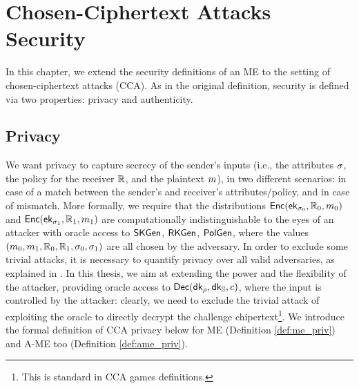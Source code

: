 \chapter{Chosen-Ciphertext Attacks Security}
In this chapter, we extend the security definitions of an ME to the setting of chosen-ciphertext attacks (CCA).
As in the original definition, security is defined via two properties: privacy and authenticity.

\section{Privacy}\label{sec:cca-privacy}
We want privacy to capture secrecy of the sender's inputs (i.e., the attributes $\sigma$, the policy for the receiver $\mathbb{R}$, and the plaintext $m$), in two different scenarios: in case of a match between the sender's and receiver's attributes/policy, and in case of mismatch.
More formally, we require that the distributions $\mathsf{Enc}(\mathsf{ek}_{\sigma_0}, \mathbb{R}_0, m_0)$ and $\mathsf{Enc}(\mathsf{ek}_{\sigma_1}, \mathbb{R}_1, m_1)$ are computationally indistinguishable to the eyes of an attacker with oracle access to $\mathsf{SKGen}$, $\mathsf{RKGen}$, $\mathsf{PolGen}$, where the values $(m_0, m_1,\mathbb{R}_0, \mathbb{R}_1, \sigma_0, \sigma_1)$ are all chosen by the adversary.
In order to exclude some trivial attacks, it is necessary to quantify privacy over all valid adversaries, as explained in \cite{Ateniese}.
\newline\newline
In this thesis, we aim at extending the power and the flexibility of the attacker, providing oracle access to $\mathsf{Dec}(\mathsf{dk}_\rho, \mathsf{dk}_{\mathbb{S}}, c)$, where the input is controlled by the attacker: clearly, we need to exclude the trivial attack of exploiting the oracle to directly decrypt the challenge chipertext\footnote{This is standard in CCA games definitions.}.
We introduce the formal definition of CCA privacy below for ME (Definition \ref{def:me_priv}) and A-ME too (Definition \ref{def:ame_priv}).




